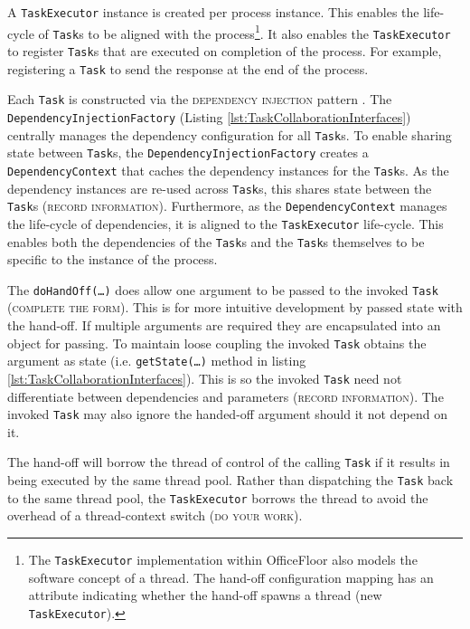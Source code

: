 \documentclass[prodmode]{style/acmlarge}
\begin{document}
A \texttt{TaskExecutor} instance is created per process instance.  This enables
the life-cycle of \texttt{Task}s to be aligned with the process\footnote{The
\texttt{TaskExecutor} implementation within OfficeFloor also models the software
concept of a thread.  The hand-off configuration mapping has an attribute
indicating whether the hand-off spawns a thread (new \texttt{TaskExecutor}).}.
It also enables the \texttt{TaskExecutor} to register \texttt{Task}s that are
executed on completion of the process.  For example, registering a \texttt{Task}
to send the response at the end of the process.

Each \texttt{Task} is constructed via the \textsc{dependency injection} pattern
\cite{ioc}.  The \texttt{Dependency\-InjectionFactory} (Listing
\ref{lst:TaskCollaborationInterfaces}) centrally manages the dependency
configuration for all \texttt{Task}s.  To enable sharing state between
\texttt{Task}s, the \texttt{Dependency\-InjectionFactory} creates a
\texttt{Depend\-ency\-Context} that caches the dependency instances for the
\texttt{Task}s.  As the dependency instances are re-used across \texttt{Task}s,
this shares state between the \texttt{Task}s (\textsc{record information}).
Furthermore, as the \texttt{Dependency\-Context} manages the life-cycle of
dependencies, it is aligned to the \texttt{TaskExecutor} life-cycle.
This enables both the dependencies of the \texttt{Task}s and the \texttt{Task}s
themselves to be specific to the instance of the process.

The \texttt{doHandOff(\ldots)} does allow one argument to be passed to the
invoked \texttt{Task} (\textsc{complete the form}).  This is for more intuitive
development by passed state with the hand-off.  If multiple arguments are
required they are encapsulated into an object for passing.
To maintain loose coupling the invoked \texttt{Task} obtains the argument as
state (i.e. \texttt{getState(\ldots)} method in listing
\ref{lst:TaskCollaborationInterfaces}).  This is so the invoked \texttt{Task}
need not differentiate between dependencies and parameters (\textsc{record
information}).  The invoked \texttt{Task} may also ignore the handed-off
argument should it not depend on it.

The hand-off will borrow the thread of control of the calling \texttt{Task} if
it results in being executed by the same thread pool.  Rather than dispatching
the \texttt{Task} back to the same thread pool, the \texttt{TaskExecutor}
borrows the thread to avoid the overhead of a thread-context switch (\textsc{do
your work}).
\end{document}
